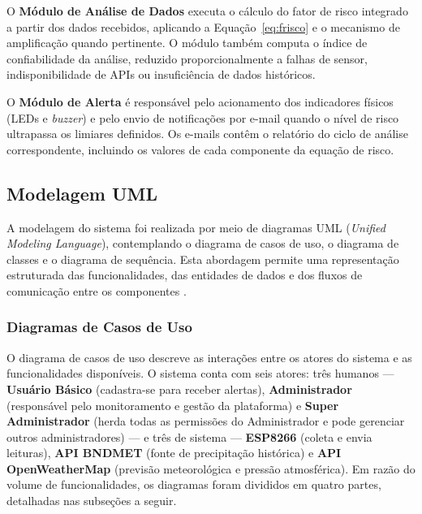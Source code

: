 O \textbf{Módulo de Análise de Dados} executa o cálculo do fator
de risco integrado a partir dos dados recebidos, aplicando a
Equação~\ref{eq:frisco} e o mecanismo de amplificação quando
pertinente. O módulo também computa o índice de confiabilidade da
análise, reduzido proporcionalmente a falhas de sensor, indisponibilidade
de APIs ou insuficiência de dados históricos.

O \textbf{Módulo de Alerta} é responsável pelo acionamento dos
indicadores físicos (LEDs e \textit{buzzer}) e pelo envio de
notificações por e-mail quando o nível de risco ultrapassa os
limiares definidos. Os e-mails contêm o relatório do ciclo de
análise correspondente, incluindo os valores de cada componente
da equação de risco.

\subsection{Modelagem UML}
\label{subsec:uml}

A modelagem do sistema foi realizada por meio de diagramas UML
(\textit{Unified Modeling Language}), contemplando o diagrama de
casos de uso, o diagrama de classes e o diagrama de sequência. Esta
abordagem permite uma representação estruturada das funcionalidades,
das entidades de dados e dos fluxos de comunicação entre os
componentes \cite{sommerville2011engenharia,larman2007utilizando}.

\subsubsection{Diagramas de Casos de Uso}
\label{subsubsec:casos-uso}

O diagrama de casos de uso descreve as interações entre os atores do
sistema e as funcionalidades disponíveis. O sistema conta com seis atores:
três humanos — \textbf{Usuário Básico} (cadastra-se para receber alertas),
\textbf{Administrador} (responsável pelo monitoramento e gestão da
plataforma) e \textbf{Super Administrador} (herda todas as permissões do
Administrador e pode gerenciar outros administradores) — e três de sistema
— \textbf{ESP8266} (coleta e envia leituras), \textbf{API BNDMET} (fonte
de precipitação histórica) e \textbf{API OpenWeatherMap} (previsão
meteorológica e pressão atmosférica). Em razão do volume de
funcionalidades, os diagramas foram divididos em quatro partes,
detalhadas nas subseções a seguir.


